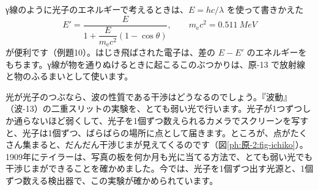 \noindent γ線のように光子のエネルギーで考えるときは、$E=hc/\lambda$ を使って書きかえた
\[ E'=\frac{E}{1+\dfrac{E}{m_{\mathrm e}c^2}(1-\cos\theta)},\qquad m_{\mathrm e}c^2=\qty{0.511}{MeV} \]
が便利です（例題10）。はじき飛ばされた電子は、差の $E-E'$ のエネルギーをもちます。γ線が物を通りぬけるときに起こるこのぶつかりは、原-13 で放射線と物のふるまいとして使います。

\label{ph:原-2:sec8}
光が光子のつぶなら、波の性質である干渉はどうなるのでしょう。『波動』（波-13）の二重スリットの実験を、とても弱い光で行います。光子が1つずつしか通らないほど弱くして、光子を1個ずつ数えられるカメラでスクリーンを写すと、光子は1個ずつ、ばらばらの場所に点として届きます。ところが、点がたくさん集まると、だんだん干渉じまが見えてくるのです（図\ref{ph:原-2:fig-ichiko}）。1909年にテイラーは、写真の板を何か月も光に当てる方法で、とても弱い光でも干渉じまができることを確かめました。今では、光子を1個ずつ出す光源と、1個ずつ数える検出器で、この実験が確かめられています。

